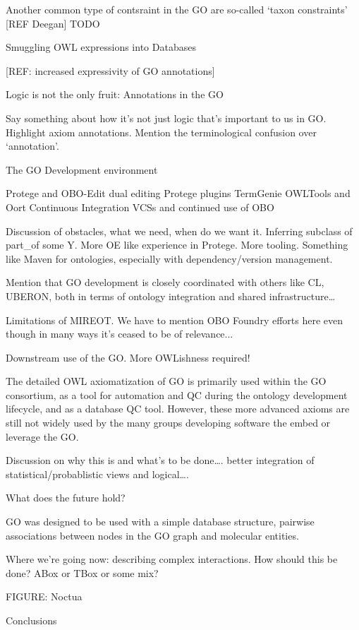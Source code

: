 \documentclass{llncs}
\begin{document}
Another common type of contsraint in the GO are so-called ‘taxon constraints’ [REF Deegan]
TODO

Smuggling OWL expressions into Databases

[REF: increased expressivity of GO annotations]

Logic is not the only fruit: Annotations in the GO

Say something about how it’s not just logic that’s important to us in GO. Highlight axiom annotations.
Mention the terminological confusion over ‘annotation’.

The GO Development environment

Protege and OBO-Edit\cite{Day-Richter2007} dual editing
Protege plugins
TermGenie
OWLTools and Oort
Continuous Integration
VCSs and continued use of OBO

Discussion of obstacles, what we need, when do we want it. Inferring subclass of part\_of some Y. More OE like experience in Protege. More tooling. Something like Maven for ontologies, especially with dependency/version management.

Mention that GO development is closely coordinated with others like CL, UBERON, both in terms of ontology integration and shared infrastructure…

Limitations of MIREOT. We have to mention OBO Foundry efforts here even though in many ways it’s ceased to be of relevance...

Downstream use of the GO. More OWLishness required!

The detailed OWL axiomatization of GO is primarily used within the GO consortium, as a tool for automation and QC during the ontology development lifecycle, and as a database QC tool. However, these more advanced axioms are still not widely used by the many groups developing software the embed or leverage the GO.

Discussion on why this is and what’s to be done…. better integration of statistical/probablistic views and logical….



What does the future hold?

GO was designed to be used with a simple database structure, pairwise associations between nodes in the GO graph and molecular entities. 

Where we’re going now: describing complex interactions. How should this be done? ABox or TBox or some mix? 

FIGURE: Noctua

Conclusions
\end{document}
